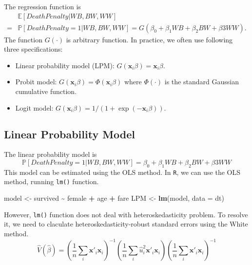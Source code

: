 \documentclass[
  12pt,
]{article}
\newenvironment{Shaded}{\begin{snugshade}}{\end{snugshade}}
\newcommand{\DataTypeTok}[1]{\textcolor[rgb]{0.13,0.29,0.53}{#1}}
\newcommand{\KeywordTok}[1]{\textcolor[rgb]{0.13,0.29,0.53}{\textbf{#1}}}
\newcommand{\NormalTok}[1]{#1}
\newcommand{\OperatorTok}[1]{\textcolor[rgb]{0.81,0.36,0.00}{\textbf{#1}}}
\newcommand{\StringTok}[1]{\textcolor[rgb]{0.31,0.60,0.02}{#1}}
\providecommand{\tightlist}{%
  \setlength{\itemsep}{0pt}\setlength{\parskip}{0pt}}
\begin{document}
The regression function is \begin{equation*}
  \begin{split}
    &\mathbb{E}[DeathPenalty | WB, BW, WW] \\
    =& \mathbb{P}[DeathPenalty = 1 | WB, BW, WW]
    = G(\beta_0 + \beta_1 WB + \beta_2 BW + \beta3 WW).
  \end{split}
\end{equation*} The function \(G(\cdot)\) is arbitrary function. In
practice, we often use following three specifications:

\begin{itemize}
\tightlist
\item
  Linear probability model (LPM):
  \(G(\mathbf{x}_i \beta) = \mathbf{x}_i \beta\).
\item
  Probit model: \(G(\mathbf{x}_i \beta) = \Phi(\mathbf{x}_i \beta)\)
  where \(\Phi(\cdot)\) is the standard Gaussian cumulative function.
\item
  Logit model:
  \(G(\mathbf{x}_i \beta) = 1/(1 + \exp(-\mathbf{x}_i \beta))\).
\end{itemize}

\hypertarget{linear-probability-model}{%
\subsection{Linear Probability Model}\label{linear-probability-model}}

The linear probability model is \begin{equation*}
  \mathbb{P}[DeathPenalty = 1 | WB, BW, WW]
  = \beta_0 + \beta_1 WB + \beta_2 BW + \beta3 WW
\end{equation*} This model can be estimated using the OLS method. In
\texttt{R}, we can use the OLS method, running \texttt{lm()} function.

\begin{Shaded}
\begin{Highlighting}[]
\NormalTok{model \textless{}{-}}\StringTok{ }\NormalTok{survived }\OperatorTok{\textasciitilde{}}\StringTok{ }\NormalTok{female }\OperatorTok{+}\StringTok{ }\NormalTok{age }\OperatorTok{+}\StringTok{ }\NormalTok{fare}
\NormalTok{LPM \textless{}{-}}\StringTok{ }\KeywordTok{lm}\NormalTok{(model, }\DataTypeTok{data =}\NormalTok{ dt)}
\end{Highlighting}
\end{Shaded}

However, \texttt{lm()} function does not deal with heteroskedasticity
problem. To resolve it, we need to claculate heteroskedasticity-robust
standard errors using the White method. \begin{equation*}
  \hat{V}(\hat{\beta}) =
  \left( \frac{1}{n} \sum_i \mathbf{x}'_i \mathbf{x}_i  \right)^{-1}
  \left( \frac{1}{n} \sum_i \hat{u}_i^2 \mathbf{x}'_i \mathbf{x}_i \right)
  \left( \frac{1}{n} \sum_i \mathbf{x}'_i \mathbf{x}_i \right)^{-1}
\end{equation*}
\end{document}
